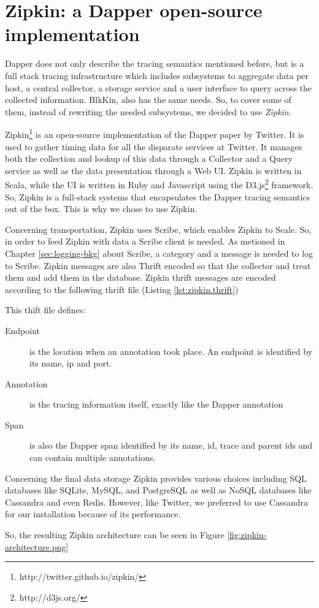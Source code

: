 \section{Zipkin: a Dapper open-source implementation}\label{sec:zipkin}

Dapper does not only describe the tracing semantics mentioned before, but is a
full stack tracing infrastructure which includes subsystems to aggregate data
per host, a central collector, a storage service and a user interface to query
across the collected information. BlkKin, also has the same needs. So, to cover
some of them, instead of rewriting the needed subsystems, we decided to use
\textit{Zipkin}.


Zipkin\footnote{http://twitter.github.io/zipkin/} is an open-source
implementation of the Dapper paper by Twitter. It is used to gather timing data
for all the disparate services at Twitter. It manages both the collection and
lookup of this data through a Collector and a Query service as well as the data
presentation through a Web UI. Zipkin is written in Scala, while the UI is
written in Ruby and Javascript using the D3.js\footnote{http://d3js.org/}
framework. So, Zipkin is a full-stack systems that encapsulates the Dapper
tracing semantics out of the box. This is why we chose to use Zipkin.

Concerning transportation, Zipkin uses Scribe, which enables Zipkin to Scale.
So, in order to feed Zipkin with data a Scribe client is needed. As metioned in
Chapter \ref{sec:logging-bkg} about Scribe, a category and a message is needed
to log to Scribe. Zipkin messages are also Thrift encoded so that the collector
and treat them and add them in the database. Zipkin thrift messages are encoded
according to the following thrift file (Listing \ref{lst:zipkin.thrift}) 

This thift file defines:

\begin{description}
\item[Endpoint] is the location when an annotation took place. An endpoint is
identified by its name, ip and port.
\item[Annotation] is the tracing information itself, exactly like the Dapper
annotation
\item[Span] is also the Dapper span identified by its name, id, trace and parent
ids and can contain multiple annotations.
\end{description} 

\label{zipkin.thrift}

Concerning the final data storage Zipkin provides various choices including SQL
databases like SQLite, MySQL, and PostgreSQL as well as NoSQL databases like
Cassandra and even Redis. However, like Twitter, we preferred to use Cassandra
for our installation because of its performance.

So, the resulting Zipkin architecture can be seen in Figure
\ref{fig:zipkin-architecture.png}
